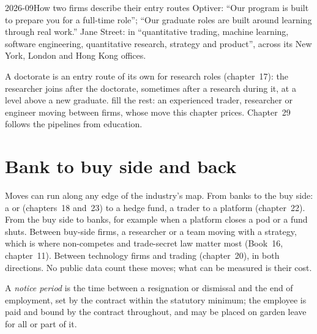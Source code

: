 \begin{dated}{2026-09}{How two firms describe their entry routes}\label{dat:in:career-paths-and-moves:entry}
Optiver: ``Our  program is built to prepare you for a full-time role''; ``Our graduate roles are built around
learning through real work.'' Jane Street:  in ``quantitative trading, machine learning, software engineering,
quantitative research, strategy and product'', across its New York, London and Hong Kong offices.
\end{dated}

A doctorate is an entry route of its own for research roles (chapter~17): the researcher joins after the doctorate,
sometimes after a research  during it, at a level above a new graduate.  fill the rest: an
experienced trader, researcher or engineer moving between firms, whose move this chapter prices. Chapter~29 follows the
pipelines from education.

\section{Bank to buy side and back}

Moves can run along any edge of the industry's map. From banks to the buy side: a  or 
(chapters~18 and~23) to a hedge fund, a trader to a platform (chapter~22). From the buy side to banks, for example when a
platform closes a pod or a fund shuts. Between buy-side firms, a researcher or a team moving with a strategy, which is
where non-competes and trade-secret law matter most (Book~16, chapter~11). Between technology firms and trading
(chapter~20), in both directions. No public data count these moves; what can be measured is their cost.

\begin{definition}\label{def:in:career-paths-and-moves:notice}
A \emph{notice period} is the time between a resignation or dismissal and the end of employment,
set by the contract within the statutory minimum; the employee is paid and bound by the contract throughout, and may be
placed on garden leave for all or part of it.
\end{definition}

